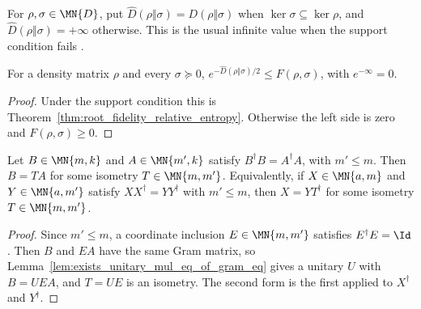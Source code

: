 \begin{definition}
    \label{def:extended_relative_entropy}
    \leanok
    For $\rho,\sigma\in\MN{D}$, put $\widehat D(\rho\Vert\sigma)
        =D(\rho\Vert\sigma)$ when $\ker\sigma\subseteq\ker\rho$, and
    $\widehat D(\rho\Vert\sigma)=+\infty$ otherwise. This is the usual
    infinite value when the support condition fails
    \cite[Section~2]{OpenAI2026PolynomialPEPS}.
\end{definition}

\begin{theorem}
    \label{thm:root_fidelity_extended_relative_entropy}
    \leanok
    For a density matrix $\rho$ and every $\sigma\succeq0$,
    $e^{-\widehat D(\rho\Vert\sigma)/2}\le F(\rho,\sigma)$, with
    $e^{-\infty}=0$.
\end{theorem}

\begin{proof}\leanok
    Under the support condition this is
    Theorem~\ref{thm:root_fidelity_relative_entropy}. Otherwise the left
    side is zero and $F(\rho,\sigma)\ge0$.
\end{proof}

\begin{theorem}
    \label{thm:gram_equal_isometry}
    \leanok
    Let $B\in\MN{m,k}$ and $A\in\MN{m',k}$ satisfy
    $B^\dagger B=A^\dagger A$, with $m'\le m$. Then $B=TA$ for some
    isometry $T\in\MN{m,m'}$. Equivalently, if $X\in\MN{a,m}$ and
    $Y\in\MN{a,m'}$ satisfy $XX^\dagger=YY^\dagger$ with $m'\le m$, then
    $X=YT^\dagger$ for some isometry $T\in\MN{m,m'}$.
\end{theorem}

\begin{proof}\leanok
    Since $m'\le m$, a coordinate inclusion $E\in\MN{m,m'}$ satisfies
    $E^\dagger E=\Id$. Then $B$ and $EA$ have the same Gram matrix, so
    Lemma~\ref{lem:exists_unitary_mul_eq_of_gram_eq} gives a unitary $U$
    with $B=UEA$, and $T=UE$ is an isometry. The second form is the first
    applied to $X^\dagger$ and $Y^\dagger$.
\end{proof}

